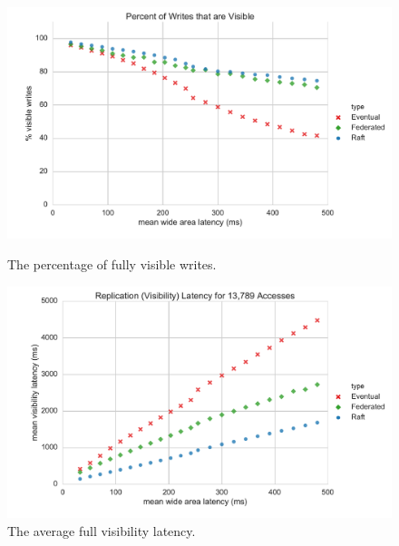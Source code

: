 \documentclass[10pt,conference,letterpaper]{IEEEtran}
\begin{document}
\begin{figure}[t]
    \centering
      \includegraphics[width=\linewidth]{figures/latency/percent_visible_writes}
      \caption{The percentage of fully visible writes.}\label{fig:visible_writes}
    \endminipage\hfill
      \includegraphics[width=\linewidth]{figures/latency/visibility_latency}
      \caption{The average full visibility latency.}\label{fig:visibility_latency}
    \endminipage\hfill
\end{figure}
\end{document}
